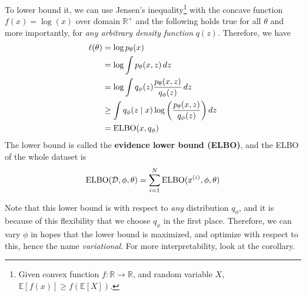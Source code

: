   \begin{definition}
    To lower bound it, we can use Jensen's inequality\footnote{Given convex function $f: \mathbb{R} \rightarrow \mathbb{R}$, and random variable $X$, $\mathbb{E}[f(x)] \geq f(\mathbb{E}[X])$.} with the concave function $f(x) = \log(x)$ over domain $\mathbb{R}^+$ and the following holds true for all $\theta$ and more importantly, for \textit{any arbitrary density function} $q(z)$. Therefore, we have 
    \begin{align}
      \ell(\theta) & = \log p_\theta (x) \\
                   & = \log \int p_\theta (x, z) \,dz \\
                   & = \log \int q_\phi (z) \frac{p_\theta (x, z)}{q_\phi (z)} \,dz \\ 
                   & \geq \int q_\phi (z \mid x) \log \bigg( \frac{p_\theta (x, z)}{q_\phi (z)} \bigg) \,dz \\  
                   & = \elbo(x, q_\phi)
    \end{align}
    The lower bound is called the \textbf{evidence lower bound (ELBO)}, and the ELBO of the whole dataset is 
    \begin{equation}
      \elbo(\mathcal{D}, \phi, \theta) = \sum_{i=1}^N \elbo(x^{(i)}, \phi, \theta)
    \end{equation}
  \end{definition} 

  Note that this lower bound is with respect to \textit{any} distribution $q_\phi$, and it is because of this flexibility that we choose $q_\phi$ in the first place. Therefore, we can vary $\phi$ in hopes that the lower bound is maximized, and optimize with respect to this, hence the name \textit{variational}. For more interpretability, look at the corollary. 

